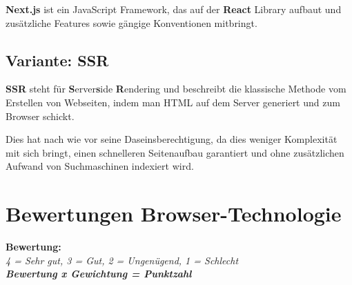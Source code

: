 \textbf{Next.js} ist ein JavaScript Framework, das auf der \textbf{React}
Library aufbaut und zusätzliche Features sowie gängige Konventionen mitbringt.

\subsection{Variante: SSR}

\textbf{SSR} steht für \textbf{S}erver\textbf{s}ide \textbf{R}endering und
beschreibt die klassische Methode vom Erstellen von Webseiten, indem man HTML
auf dem Server generiert und zum Browser schickt.

Dies hat nach wie vor seine Daseinsberechtigung, da dies weniger Komplexität
mit sich bringt, einen schnelleren Seitenaufbau garantiert und ohne
zusätzlichen Aufwand von Suchmaschinen indexiert wird.

\clearpage
\section{Bewertungen Browser-Technologie}\label{bewertungen-browser-technologie}

\textbf{Bewertung:}\\
\textit{4 = Sehr gut, 3 = Gut, 2 = Ungenügend, 1 = Schlecht}\\


\textbf{\textit{Bewertung x Gewichtung = Punktzahl}}

